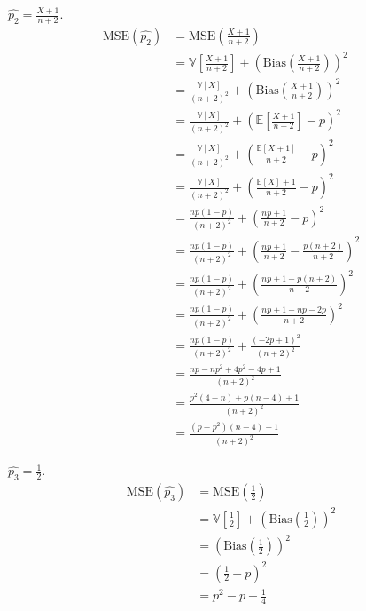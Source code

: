 \documentclass[12pt]{article}
\begin{document}
\newpage
{} $\hat{p_2} = \frac{X+1}{n+2}$.
\begin{align*}
    \text{MSE}(\hat{p_2}) &= \text{MSE}\left(\frac{X+1}{n+2}\right) \\
                          &= \mathbb V\left[\frac{X+1}{n+2}\right] + \left(\text{Bias}\left(\frac{X+1}{n+2}\right)\right)^2 \\
                          &= \frac{\mathbb V[X]}{(n+2)^2} + \left(\text{Bias}\left(\frac{X+1}{n+2}\right)\right)^2 \\
                          &= \frac{\mathbb V[X]}{(n+2)^2} + \left( \mathbb E \left[ \frac{X+1}{n+2} \right] - p \right)^2 \\
                          &= \frac{\mathbb V[X]}{(n+2)^2} + \left( \frac{\mathbb E[X+1]}{n+2} - p \right)^2 \\
                          &= \frac{\mathbb V[X]}{(n+2)^2} + \left( \frac{\mathbb E[X] + 1}{n+2} - p \right)^2 \\
                          &= \frac{np(1-p)}{(n+2)^2} + \left( \frac{np + 1}{n+2} - p \right)^2 \\
                          &= \frac{np(1-p)}{(n+2)^2} + \left( \frac{np + 1}{n+2} - \frac{p(n+2)}{n+2} \right)^2 \\
                          &= \frac{np(1-p)}{(n+2)^2} + \left( \frac{np + 1 - p(n+2)}{n+2} \right)^2 \\
                          &= \frac{np(1-p)}{(n+2)^2} + \left( \frac{np + 1 - np-2p}{n+2} \right)^2 \\
                          &= \frac{np(1-p)}{(n+2)^2} + \frac{(-2p + 1)^2}{(n+2)^2} \\
                          &= \frac{np-np^2 + 4p^2 - 4p + 1}{(n+2)^2} \\
                          &= \frac{p^2(4-n)+p(n-4)+1}{(n+2)^2} \\
                          &= \frac{(p - p^2)(n-4)+1}{(n+2)^2}
\end{align*}

\newpage
{} $\hat{p_3} = \frac12$.
\begin{align*}
    \text{MSE}(\hat{p_3}) &= \text{MSE}\left(\frac12\right) \\
                          &= \mathbb V\left[\frac12\right] + \left(\text{Bias}\left(\frac12\right)\right)^2 \\
                          &= \left(\text{Bias}\left(\frac12\right)\right)^2 \\
                          &= \left(\frac12 - p\right)^2 \\
                          &= p^2 - p + \frac14
\end{align*}
\end{document}
